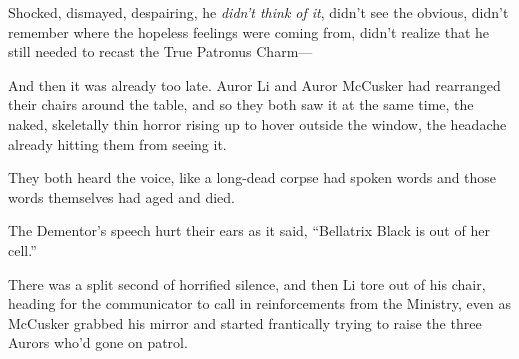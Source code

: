 Shocked, dismayed, despairing, he \emph{didn’t think of it}, didn’t see the obvious, didn’t remember where the hopeless feelings were coming from, didn’t realize that he still needed to recast the True Patronus Charm—

And then it was already too late.
\sbreak
Auror Li and Auror McCusker had rearranged their chairs around the table, and so they both saw it at the same time, the naked, skeletally thin horror rising up to hover outside the window, the headache already hitting them from seeing it.

They both heard the voice, like a long-dead corpse had spoken words and those words themselves had aged and died.

The Dementor’s speech hurt their ears as it said, “Bellatrix Black is out of her cell.”

There was a split second of horrified silence, and then Li tore out of his chair, heading for the communicator to call in reinforcements from the Ministry, even as McCusker grabbed his mirror and started frantically trying to raise the three Aurors who’d gone on patrol.

